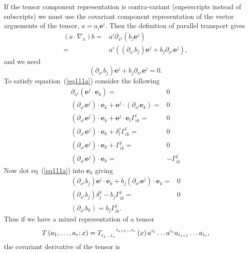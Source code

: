 \documentclass[12pt]{report}
\newcommand{\bm}[1]{\boldsymbol{#1}}
\newcommand{\lp}{\left (}
\newcommand{\rp}{\right )}
\newcommand{\f}[2]{{#1}\lp {#2} \rp}
\newcommand{\paren}[1]{\lp {#1} \rp}
\newcommand{\be}{\begin{equation}}
\newcommand{\ee}{\end{equation}}
\newcommand{\eb}{\bm{e}}
\begin{document}
If the tensor component representation is contra-variant (superscripts instead of subscripts) we must use the covariant component representation of
the vector arguements of the tensor, $a = a_{i}\eb^{i}$.  Then the definition of parallel transport gives
\begin{align}
	\paren{a\cdot\nabla_{x}}b =& a^{i}\partial_{x^{i}}\paren{b_{j}\eb^{j}} \nonumber \\
	                          =& a^{i}\paren{\paren{\partial_{x^{i}}b_{j}}\eb^{j} + b_{j}\partial_{x^{i}}\eb^{j}},
\end{align}
and we need
\be
	\paren{\partial_{x^{i}}b_{j}}\eb^{j} + b_{j}\partial_{x^{i}}\eb^{j} = 0. \label{eq111a}
\ee
To satisfy equation~(\ref{eq111a}) consider the following
\begin{align}
	\partial_{x^{i}}\paren{\eb^{j}\cdot\eb_{k}} =& 0 \nonumber \\
	\paren{\partial_{x^{i}}\eb^{j}}\cdot\eb_{k} + \eb^{j}\cdot\paren{\partial_{x^{i}}\eb_{k}} =& 0  \nonumber \\
	\paren{\partial_{x^{i}}\eb^{j}}\cdot\eb_{k} + \eb^{j}\cdot\eb_{l}\Gamma_{ik}^{l} =& 0 \nonumber \\
	\paren{\partial_{x^{i}}\eb^{j}}\cdot\eb_{k} + \delta_{l}^{j}\Gamma_{ik}^{l} =& 0 \nonumber \\
	\paren{\partial_{x^{i}}\eb^{j}}\cdot\eb_{k} + \Gamma_{ik}^{j} =& 0 \nonumber \\
	\paren{\partial_{x^{i}}\eb^{j}}\cdot\eb_{k} =& -\Gamma_{ik}^{j}
\end{align}
Now dot eq~(\ref{eq111a}) into $\eb_{k}$ giving
\begin{align}
	\paren{\partial_{x^{i}}b_{j}}\eb^{j}\cdot\eb_{k} + b_{j}\paren{\partial_{x^{i}}\eb^{j}}\cdot\eb_{k} =& 0  \nonumber \\
	\paren{\partial_{x^{i}}b_{j}}\delta_{j}^{k} - b_{j}\Gamma_{ik}^{j} =& 0 \nonumber \\
	\paren{\partial_{x^{i}}b_{k}} = b_{j}\Gamma_{ik}^{j}.
\end{align}
Thus if we have a mixed representation of a tensor 
\be
\f{T}{a_{1},\dots,a_{r};x} = 
	\f{T\indices{_{i_{1}\dots i_{s}}^{i_{s+1}\dots i_{r}}}}{x}a^{i_{1}}\dots a^{i_{s}}a_{i_{s+1}}\dots a_{i_{r}},
\ee
the covariant derivative of the tensor is
\end{document}
